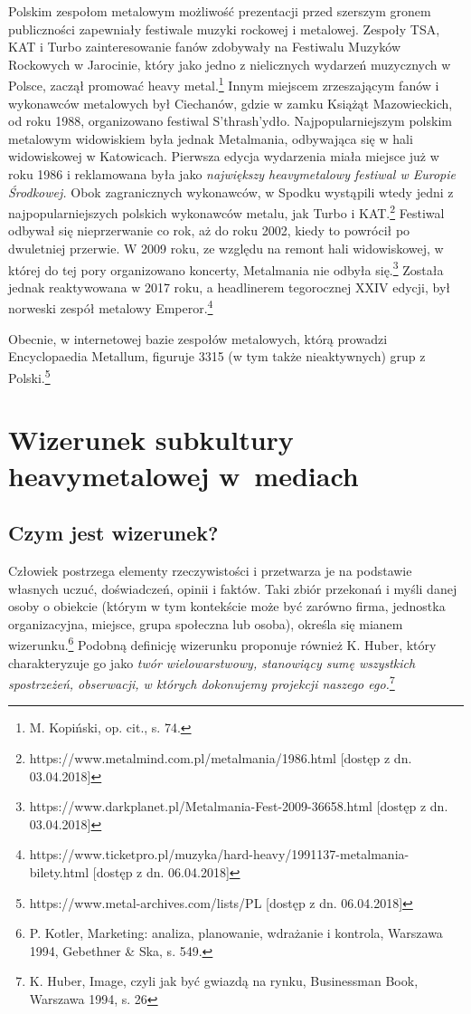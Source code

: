 \documentclass[12pt, a4paper, titlepage]{report}
\begin{document}
Polskim zespołom metalowym możliwość prezentacji przed szerszym gronem publiczności zapewniały festiwale muzyki rockowej i metalowej. Zespoły TSA, KAT i Turbo zainteresowanie fanów zdobywały na Festiwalu Muzyków Rockowych w Jarocinie, który jako jedno z nielicznych wydarzeń muzycznych w Polsce, zaczął promować heavy metal.\footnote{M. Kopiński, op. cit., s. 74.} Innym miejscem zrzeszającym fanów i wykonawców metalowych był Ciechanów, gdzie w zamku Książąt Mazowieckich, od roku 1988, organizowano festiwal S'thrash'ydło. Najpopularniejszym polskim metalowym widowiskiem była jednak Metalmania, odbywająca się w hali widowiskowej w Katowicach. Pierwsza edycja wydarzenia miała miejsce już w roku 1986 i reklamowana była jako \textit{największy heavymetalowy festiwal w Europie Środkowej.} Obok zagranicznych wykonawców, w Spodku wystąpili wtedy jedni z najpopularniejszych polskich wykonawców metalu, jak Turbo i KAT.\footnote{https://www.metalmind.com.pl/metalmania/1986.html [dostęp z dn. 03.04.2018]} Festiwal odbywał się nieprzerwanie co rok, aż do roku 2002, kiedy to powrócił po dwuletniej przerwie. W 2009 roku, ze względu na remont hali widowiskowej, w której do tej pory organizowano koncerty, Metalmania nie odbyła się.\footnote{https://www.darkplanet.pl/Metalmania-Fest-2009-36658.html [dostęp z dn. 03.04.2018]} Została jednak reaktywowana w 2017 roku, a headlinerem tegorocznej XXIV edycji, był norweski zespół metalowy Emperor.\footnote{https://www.ticketpro.pl/muzyka/hard-heavy/1991137-metalmania-bilety.html [dostęp z dn. 06.04.2018]} 

Obecnie, w internetowej bazie zespołów metalowych, którą prowadzi Encyclopaedia Metallum, figuruje 3315 (w tym także nieaktywnych) grup z Polski.\footnote{https://www.metal-archives.com/lists/PL [dostęp z dn. 06.04.2018]} 

\chapter{Wizerunek subkultury heavymetalowej w~mediach}
\section{Czym jest wizerunek?}
Człowiek postrzega elementy rzeczywistości i przetwarza je na podstawie własnych uczuć, doświadczeń, opinii i faktów. Taki zbiór przekonań i myśli danej osoby o obiekcie (którym w tym kontekście może być zarówno firma, jednostka organizacyjna, miejsce, grupa społeczna lub osoba), określa się mianem wizerunku.\footnote{P. Kotler, Marketing: analiza, planowanie, wdrażanie i kontrola, Warszawa 1994, Gebethner \& Ska, s. 549.} Podobną definicję wizerunku proponuje również K. Huber, który charakteryzuje go jako \textit{twór wielowarstwowy, stanowiący sumę wszystkich spostrzeżeń, obserwacji, w których dokonujemy projekcji naszego ego.}\footnote{K. Huber, Image, czyli jak być gwiazdą na rynku, Businessman Book, Warszawa 1994, s. 26} 
\end{document}

